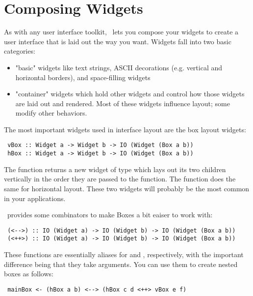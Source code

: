 \section{Composing Widgets}

As with any user interface toolkit, \vtyui\ lets you compose your
widgets to create a user interface that is laid out the way you want.
Widgets fall into two basic categories:

\begin{itemize}
\item "basic" widgets like text strings, ASCII decorations
      (e.g. vertical and horizontal borders), and space-filling
      widgets
\item "container" widgets which hold other widgets and control how
      those widgets are laid out and rendered.  Most of these widgets
      influence layout; some modify other behaviors.
\end{itemize}

The most important widgets used in interface layout are the box layout
widgets:

\begin{verbatim}
 vBox :: Widget a -> Widget b -> IO (Widget (Box a b))
 hBox :: Widget a -> Widget b -> IO (Widget (Box a b))
\end{verbatim}

The  function returns a new widget of type  which lays out its two children vertically in the order they are
passed to the function.  The  function does the same for
horizontal layout.  These two widgets will probably be the most common
in your applications.

\vtyui\ provides some combinators to make Boxes a bit eaiser to work
with:

\begin{verbatim}
 (<-->) :: IO (Widget a) -> IO (Widget b) -> IO (Widget (Box a b))
 (<++>) :: IO (Widget a) -> IO (Widget b) -> IO (Widget (Box a b))
\end{verbatim}

These functions are essentially aliases for  and ,
respectively, with the important difference being that they take
 arguments.  You can use them to create nested boxes as
follows:

\begin{verbatim}
 mainBox <- (hBox a b) <--> (hBox c d <++> vBox e f)
\end{verbatim}

